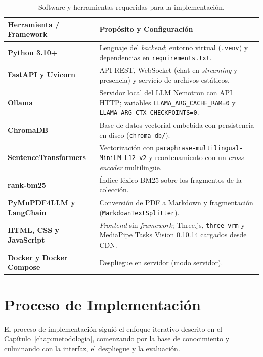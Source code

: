 \begin{table}[H]
  \caption{Software y herramientas requeridas para la implementación.}
  \label{tab:requisitos_software}
  \centering
  \renewcommand{\arraystretch}{1.2}
  \begin{tabular}{|p{4cm}|p{9cm}|}
    \hline
    \rowcolor[HTML]{EFEFEF}
    \textbf{Herramienta / Framework} & \textbf{Propósito y Configuración} \\ \hline
    \textbf{Python 3.10+} & Lenguaje del \textit{backend}; entorno virtual (\texttt{.venv}) y dependencias en \texttt{requirements.\allowbreak{}txt}. \\ \hline
    \textbf{FastAPI y Uvicorn} & API REST, WebSocket (chat en \textit{streaming} y presencia) y servicio de archivos estáticos. \\ \hline
    \textbf{Ollama} & Servidor local del LLM Nemotron con API HTTP; variables \texttt{LLAMA\_\allowbreak{}ARG\_\allowbreak{}CACHE\_\allowbreak{}RAM=0} y \texttt{LLAMA\_\allowbreak{}ARG\_\allowbreak{}CTX\_\allowbreak{}CHECKPOINTS=0}. \\ \hline
    \textbf{ChromaDB} & Base de datos vectorial embebida con persistencia en disco (\texttt{chroma\_db/}). \\ \hline
    \textbf{Sentence\-Transformers} & Vectorización con \texttt{paraphrase-\allowbreak{}\-\allowbreak{}multilingual-\allowbreak{}\-\allowbreak{}MiniLM-\allowbreak{}\-\allowbreak{}L12-\allowbreak{}\-\allowbreak{}v2} y reordenamiento con un \textit{cross-encoder} multilingüe. \\ \hline
    \textbf{rank-bm25} & Índice léxico BM25 sobre los fragmentos de la colección. \\ \hline
    \textbf{PyMuPDF4LLM y LangChain} & Conversión de PDF a Markdown y fragmentación (\texttt{MarkdownTextSplitter}). \\ \hline
    \textbf{HTML, CSS y JavaScript} & \textit{Frontend} sin \textit{framework}; Three.js, \texttt{three-vrm} y MediaPipe Tasks Vision 0.10.14 cargados desde CDN. \\ \hline
    \textbf{Docker y Docker Compose} & Despliegue en servidor (modo servidor). \\ \hline
  \end{tabular}
  \elaboradopor{\autorTFG}
\end{table}

\section{Proceso de Implementación}
El proceso de implementación siguió el enfoque iterativo descrito en el Capítulo~\ref{chap:metodologia}, comenzando por la base de conocimiento y culminando con la interfaz, el despliegue y la evaluación.


